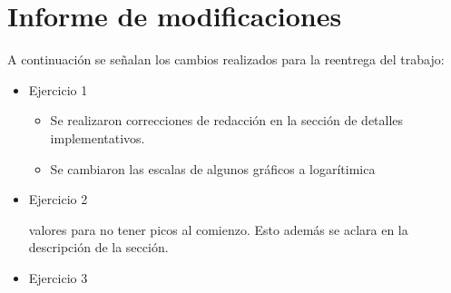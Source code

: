 \section*{Informe de modificaciones}

A continuación se señalan los cambios realizados para la reentrega del trabajo:

\begin{itemize}
	\item{
		Ejercicio 1
		\begin{itemize}
			\item Se realizaron correcciones de redacción en la sección de detalles implementativos.
			\item Se cambiaron las escalas de algunos gráficos a logarítimica
		\end{itemize}
	}
	\item{
		Ejercicio 2
		\begin{itemize}
			valores para no tener picos al comienzo. Esto además se aclara en la
			descripción de la sección.
		\end{itemize}
	}
	\item{
		Ejercicio 3
		\begin{itemize}
		\end{itemize}
	}
\end{itemize}
